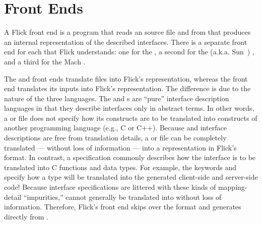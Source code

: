 

\chapter{Front Ends}
\label{cha:FE}

A Flick front end is a program that reads an \IDL{} source file and from that
produces an internal representation of the described interfaces.  There is a
separate front end for each \IDL{} that Flick understands: one for the \CORBA{}
\IDL{}, a second for the \ONCRPC{} (a.k.a. Sun~\RPC{}) \IDL{}, and a third for
the Mach \MIG{} \IDL{}.

The \CORBA{} and \ONCRPC{} front ends translate \IDL{} files into Flick's
\AOI{} representation, whereas the \MIG{} front end translates its inputs into
Flick's \PRESC{} representation.  The difference is due to the nature of the
three languages.
%
The \CORBA{} and \ONCRPC{} \IDL{}s are ``pure'' interface description languages
in that they describe interfaces only in abstract terms.  In other words, a
\CORBA{} or \ONCRPC{} \IDL{} file does not specify how its \IDL{} constructs
are to be translated into constructs of another programming language (e.g., C
or C++).  Because \CORBA{} and \ONCRPC{} interface descriptions are free from
translation details, a \CORBA{} or \ONCRPC{} \IDL{} file can be completely
translated --- without loss of information --- into a representation in Flick's
\AOI{} format.
%
In contrast, a \MIG{} \IDL{} specification commonly describes how the interface
is to be translated into C functions and data types.  For example, the \MIG{}
\IDL{} keywords  and  specify how a \MIG{}
\IDL{} type will be translated into the generated client-side and server-side
code!  Because \MIG{} interface specifications are littered with these kinds of
mapping-detail ``impurities,'' \MIG{} \IDL{} cannot generally be translated
into \AOI{} without loss of information.  Therefore, Flick's \MIG{} front end
skips over the \AOI{} format and generates \PRESC{} directly from \MIG{}
\IDL{}\@.

